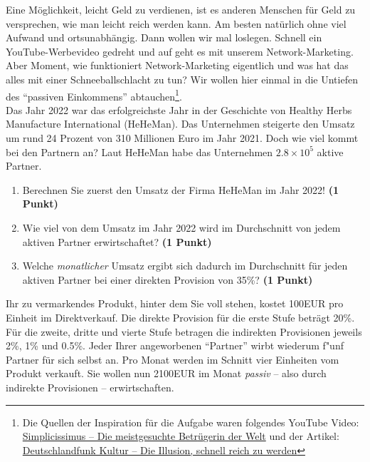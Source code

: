 \documentclass[a4paper, 9pt]{scrartcl}\usepackage[]{graphicx}\usepackage[]{xcolor}
\begin{document}
Eine M{\"o}glichkeit, leicht Geld zu verdienen, ist es anderen Menschen f{\"u}r Geld
zu versprechen, wie man leicht reich werden kann. Am besten nat{\"u}rlich ohne
viel Aufwand und ortsunabh{\"a}ngig. Dann wollen wir mal loslegen. Schnell
ein YouTube-Werbevideo gedreht und auf geht es mit unserem
Network-Marketing. Aber Moment, wie funktioniert Network-Marketing
eigentlich und was hat das alles mit einer Schneeballschlacht zu tun? Wir
wollen hier einmal in die Untiefen des "`passiven Einkommens"'
abtauchen\footnote{Die Quellen der Inspiration f{\"u}r die Aufgabe waren
  folgendes YouTube Video:
  \href{https://youtu.be/UOKkZF_qK9M?si=uf4foJVFKfeQMwSw}{Simplicissimus --
    Die meistgesuchte Betr{\"u}gerin der Welt} und der Artikel:
  \href{https://www.deutschlandfunkkultur.de/netzwerk-marketing-die-illusion-schnell-reich-zu-werden-100.html}{
    Deutschlandfunk Kultur -- Die Illusion, schnell reich zu werden}}.\\

Das Jahr 2022 war das erfolgreichste Jahr in der Geschichte von
Healthy Herbs Manufacture International (HeHeMan). Das Unternehmen steigerte den Umsatz um rund
24 Prozent von 310 Millionen Euro im Jahr
2021. Doch wie viel kommt bei den Partnern an? Laut
HeHeMan habe das Unternehmen \ensuremath{2.8\times 10^{5}} aktive Partner.

\begin{enumerate}
\item Berechnen Sie zuerst den Umsatz der Firma HeHeMan im
  Jahr 2022! \textbf{(1 Punkt)}
\item Wie viel von dem Umsatz im Jahr 2022 wird im Durchschnitt von jedem
  aktiven Partner erwirtschaftet? \textbf{(1 Punkt)}
\item Welche \textit{monatlicher} Umsatz ergibt sich dadurch im
  Durchschnitt f{\"u}r jeden aktiven Partner bei einer direkten Provision von
  35\%? \textbf{(1 Punkt)}
\end{enumerate}

Ihr zu vermarkendes Produkt, hinter dem Sie voll stehen, kostet
100EUR pro Einheit im Direktverkauf. Die direkte Provision
f{\"u}r die erste Stufe betr{\"a}gt 20\%. F{\"u}r die zweite, dritte und
vierte Stufe betragen die indirekten Provisionen jeweils 2\%,
1\% und 0.5\%. Jeder Ihrer angeworbenen "`Partner"'
wirbt wiederum f{"u}nf Partner f{\"u}r sich selbst an. Pro Monat
werden im Schnitt vier Einheiten vom Produkt verkauft. Sie wollen nun
2100EUR im Monat \textit{passiv} -- also durch indirekte
Provisionen -- erwirtschaften.
\end{document}

